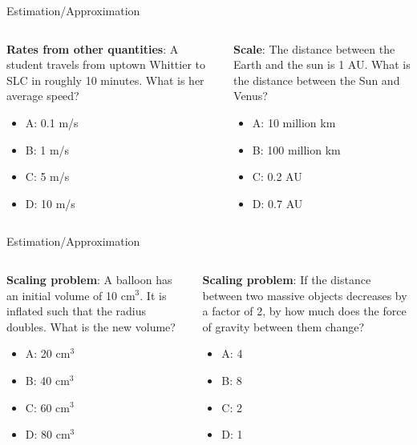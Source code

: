 \documentclass{beamer}
\begin{document}
\begin{frame}{Estimation/Approximation}
\small
\begin{columns}[T]
\begin{column}{0.5\textwidth}
\textbf{Rates from other quantities}: A student travels from uptown Whittier to SLC in roughly 10 minutes.  What is her average speed?
\begin{itemize}
\item A: 0.1 m/s
\item B: 1 m/s
\item C: 5 m/s
\item D: 10 m/s
\end{itemize}
\end{column}
\begin{column}{0.5\textwidth}
\textbf{Scale}: The distance between the Earth and the sun is 1 AU.  What is the distance between the Sun and Venus?
\vspace{0.55cm}
\begin{itemize}
\item A: 10 million km
\item B: 100 million km
\item C: 0.2 AU
\item D: 0.7 AU
\end{itemize}
\end{column}
\end{columns}
\end{frame}

\begin{frame}{Estimation/Approximation}
\small
\begin{columns}[T]
\begin{column}{0.5\textwidth}
\textbf{Scaling problem}: A balloon has an initial volume of 10 cm$^3$.  It is inflated such that the radius doubles.  What is the new volume?
\begin{itemize}
\item A: 20 cm$^3$
\item B: 40 cm$^3$
\item C: 60 cm$^3$
\item D: 80 cm$^3$
\end{itemize}
\end{column}
\begin{column}{0.5\textwidth}
\textbf{Scaling problem}: If the distance between two massive objects decreases by a factor of 2, by how much does the force of gravity between them change?
\vspace{0.55cm}
\begin{itemize}
\item A: 4
\item B: 8
\item C: 2
\item D: 1
\end{itemize}
\end{column}
\end{columns}
\end{frame}
\end{document}
